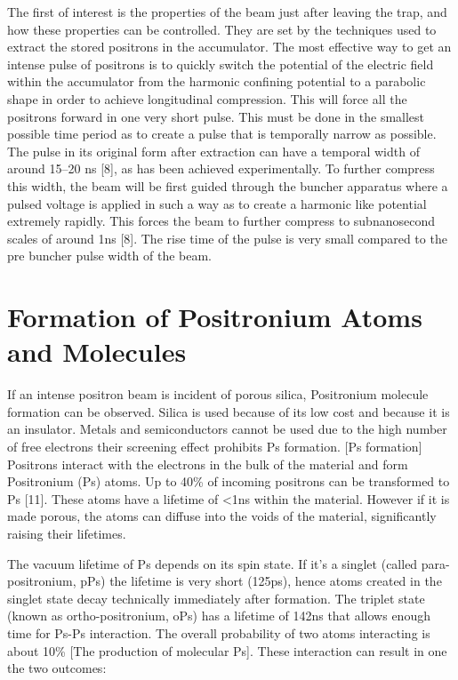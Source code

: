 The first of interest is the properties of the beam just after leaving the trap, and how these properties can be controlled. They are set by the techniques used to extract the stored positrons in the accumulator. The most effective way to get an intense pulse of positrons is to quickly switch the potential of the electric field within the accumulator from the harmonic confining potential to a parabolic shape in order to achieve longitudinal compression. This will force all the positrons forward in one very short pulse. This must be done in the smallest possible time period as to create a pulse that is temporally narrow as possible. The pulse in its original form after extraction can have a temporal width of around 15–20 ns [8], as has been achieved experimentally. To further compress this width, the beam will be first guided through the buncher apparatus where a pulsed voltage is applied in such a way as to create a harmonic like potential extremely rapidly. This forces the beam to further compress to subnanosecond scales of around 1ns [8]. The rise time of the pulse is very small compared to the pre buncher pulse width of the beam.

\section{Formation of Positronium Atoms and Molecules}

If an intense positron beam is incident of porous silica, Positronium molecule formation can be observed. Silica is used because of its low cost and because it is an insulator. Metals and semiconductors cannot be used due to the high number of free electrons their screening effect prohibits Ps formation. [Ps formation] Positrons interact with the electrons in the bulk of the material and form Positronium (Ps) atoms. Up to 40\% of incoming positrons can be transformed to Ps [11]. These atoms have a lifetime of <1ns within the material. However if it is made porous, the atoms can diffuse into the voids of the material, significantly raising their lifetimes.

The vacuum lifetime of Ps depends on its spin state. If it’s a singlet (called para-positronium, pPs) the lifetime is very short (125ps), hence atoms created in the singlet state decay technically immediately after formation. The triplet state (known as ortho-positronium, oPs) has a lifetime of 142ns that allows enough time for Ps-Ps interaction.  The overall probability of two atoms interacting is about 10\% [The production of molecular Ps]. These interaction can result in one the two outcomes:

